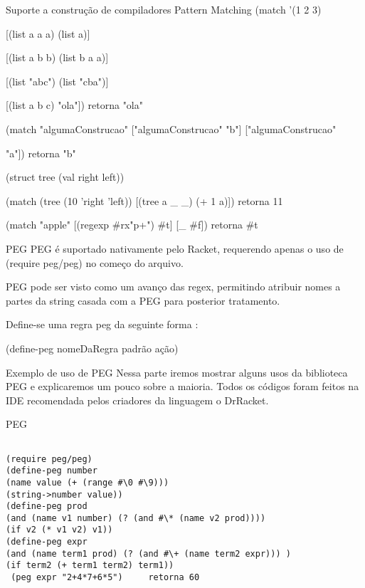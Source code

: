 \documentclass{beamer}
\begin{document}
\begin{frame}[fragile]{Suporte a construção de compiladores}
Pattern Matching
(match '(1 2 3)
 
      [(list a a a) (list a)]
      
      [(list a b b) (list b a a)]
      
      [(list "abc") (list "cba")]
      
      [(list a b c) "ola"]) retorna "ola"
      
 (match "algumaConstrucao" ["algumaConstrucao" "b"] ["algumaConstrucao" 
 
 "a"]) retorna "b"
 
 (struct tree (val right left))
 
 (match (tree (10 'right 'left)) [(tree a \_ \_) (+ 1 a)]) retorna 11
 
 (match "apple" [(regexp \#rx"p+") \#t] [\_ \#f])  retorna \#t
\end{frame}


\begin{frame}{PEG}
PEG é suportado nativamente pelo Racket, requerendo apenas o uso de (require peg/peg) no começo do arquivo.

PEG pode ser visto como um avanço das regex, permitindo atribuir nomes a partes da string casada com a PEG para posterior tratamento.

Define-se uma regra peg da seguinte forma :

(define-peg nomeDaRegra padrão ação)

\end{frame}


\begin{frame}{Exemplo de uso de PEG}
Nessa parte iremos mostrar alguns usos da biblioteca PEG e explicaremos um pouco sobre a maioria.
Todos os códigos foram feitos na IDE recomendada pelos criadores da linguagem o DrRacket.
\end{frame}





\begin{frame}[fragile]{PEG}
\begin{verbatim}

(require peg/peg)
(define-peg number
(name value (+ (range #\0 #\9)))
(string->number value))
(define-peg prod
(and (name v1 number) (? (and #\* (name v2 prod))))
(if v2 (* v1 v2) v1))
(define-peg expr
(and (name term1 prod) (? (and #\+ (name term2 expr))) )
(if term2 (+ term1 term2) term1))
 (peg expr "2+4*7+6*5")     retorna 60
\end{verbatim}
\end{frame}
\end{document}
